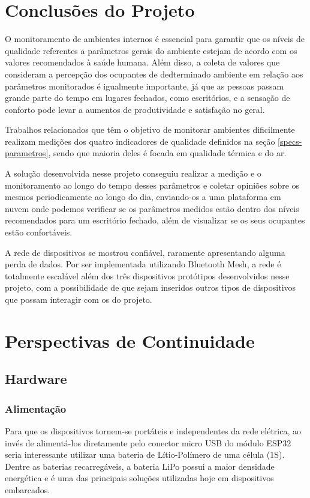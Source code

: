 \documentclass[../monografia.tex]{subfiles}
\begin{document}
\section{Conclusões do Projeto}

O monitoramento de ambientes internos é essencial para garantir que os níveis de qualidade referentes a parâmetros gerais do ambiente estejam de acordo com os valores recomendados à saúde humana. Além disso, a coleta de valores que consideram a percepção dos ocupantes de dedterminado ambiente em relação aos parâmetros monitorados é igualmente importante, já que as pessoas passam grande parte do tempo em lugares fechados, como escritórios, e a sensação de conforto pode levar a aumentos de produtividade e satisfação no geral.

Trabalhos relacionados que têm o objetivo de monitorar ambientes dificilmente realizam medições dos quatro indicadores de qualidade definidos na seção \ref{specs-parametros}, sendo que maioria deles é focada em qualidade térmica e do ar.

A solução desenvolvida nesse projeto conseguiu realizar a medição e o monitoramento ao longo do tempo desses parâmetros e coletar opiniões sobre os mesmos periodicamente ao longo do dia, enviando-os a uma plataforma em nuvem onde podemos verificar se os parâmetros medidos estão dentro dos níveis recomendados para um escritório fechado, além de visualizar se os seus ocupantes estão confortáveis.

A rede de dispositivos se mostrou confiável, raramente apresentando alguma perda de dados. Por ser implementada utilizando Bluetooth Mesh, a rede é totalmente escalável além dos três dispositivos protótipos desenvolvidos nesse projeto, com a possibilidade de que sejam inseridos outros tipos de dispositivos que possam interagir com os do projeto. 

\section{Perspectivas de Continuidade}
\subsection{Hardware}
\subsubsection{Alimentação}

Para que os dispositivos tornem-se portáteis e independentes da rede elétrica, ao invés de alimentá-los diretamente pelo conector micro USB do módulo ESP32 seria interessante utilizar uma bateria de Lítio-Polímero de uma célula (1S). Dentre as baterias recarregáveis, a bateria LiPo possui a maior densidade energética e é uma das principais soluções utilizadas hoje em dispositivos embarcados. %
\end{document}
